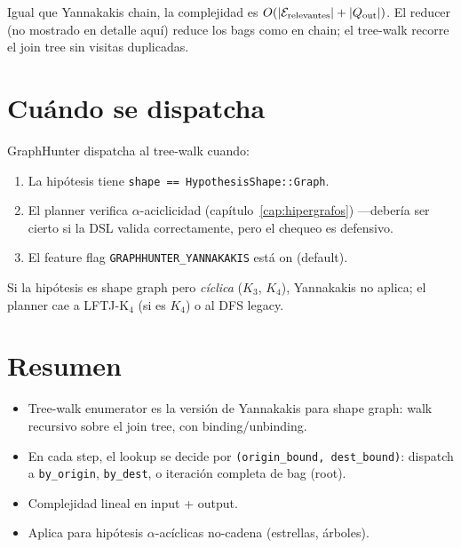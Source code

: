 Igual que Yannakakis chain, la complejidad es
\(O(|\mathcal{E}_{\text{relevantes}}| + |Q_{\text{out}}|)\). El reducer
(no mostrado en detalle aquí) reduce los bags como en chain; el
tree-walk recorre el join tree sin visitas duplicadas.

\section{Cuándo se dispatcha}

GraphHunter dispatcha al tree-walk cuando:

\begin{enumerate}
    \item La hipótesis tiene \texttt{shape == HypothesisShape::Graph}.
    \item El planner verifica \(\alpha\)-aciclicidad
    (capítulo~\ref{cap:hipergrafos}) ---debería ser cierto si la DSL
    valida correctamente, pero el chequeo es defensivo.
    \item El feature flag \texttt{GRAPHHUNTER\_YANNAKAKIS} está
    on (default).
\end{enumerate}

\noindent
Si la hipótesis es shape graph pero \emph{cíclica} (\(K_3\),
\(K_4\)), Yannakakis no aplica; el planner cae a LFTJ-K\(_4\) (si
es \(K_4\)) o al DFS legacy.

\section{Resumen}

\begin{itemize}
    \item Tree-walk enumerator es la versión de Yannakakis para
    shape graph: walk recursivo sobre el join tree, con
    binding/unbinding.
    \item En cada step, el lookup se decide por
    \texttt{(origin\_bound, dest\_bound)}: dispatch a
    \texttt{by\_origin}, \texttt{by\_dest}, o iteración completa
    de bag (root).
    \item Complejidad lineal en input + output.
    \item Aplica para hipótesis \(\alpha\)-acíclicas no-cadena
    (estrellas, árboles).
\end{itemize}

